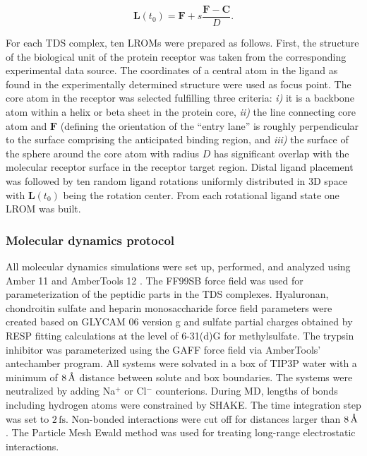 \begin{equation}
\bm{L}(t_0) = \bm{F} + s \frac{\bm{F}-\bm{C}}{D}.
\end{equation}

For each TDS complex, ten LROMs were prepared as follows. First, the structure of the biological unit of
the protein receptor was
taken from the corresponding experimental data source. The coordinates of a
central atom in the ligand as found in the experimentally determined structure
were used as focus point. The core atom in the receptor was selected fulfilling
three criteria: \textit{i)} it is a backbone atom within a helix or beta sheet in the
protein core, \textit{ii)} the line connecting core atom and $\bm{F}$ (defining the orientation of
the ``entry lane'' is roughly perpendicular to the surface comprising the
anticipated binding region, and \textit{iii)} the
surface of the sphere around the core atom with radius $D$ has significant overlap
with the molecular receptor surface in the receptor target region. Distal
ligand placement was followed by ten random ligand rotations uniformly
distributed in 3D space with $\bm{L}(t_0)$ being the rotation center. From each
rotational ligand state one LROM was built.


\subsubsection{Molecular dynamics protocol}
All molecular dynamics simulations were set up, performed, and analyzed
using Amber 11 and AmberTools 12 \cite{case_amber_11}. The FF99SB force field was used for
parameterization of the peptidic parts in the TDS complexes. Hyaluronan, chondroitin
sulfate and heparin monosaccharide force field parameters were created based on
GLYCAM 06 version g \cite{kirschner_glycam06:_2008} and sulfate partial
charges obtained by RESP fitting calculations at the level of 6-31(d)G for
methylsulfate.
The trypsin inhibitor was parameterized using the GAFF force field via
AmberTools' antechamber program. All systems were solvated in a box of TIP3P
water with a minimum of $8\,\textup{\AA}$ distance between solute and box boundaries. The
systems were neutralized by adding Na$^{+}$ or Cl$^{-}$ counterions. During MD, lengths of
bonds including hydrogen atoms were constrained by SHAKE. The time integration
step was set to $2\,\mathrm{fs}$. Non-bonded interactions were cut off for distances larger
than $8\,\textup{\AA}$. The Particle Mesh Ewald method was used for treating long-range
electrostatic interactions.



